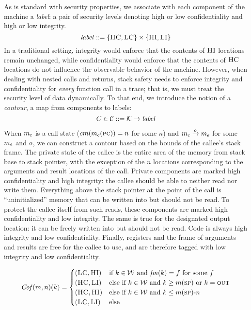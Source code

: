 \documentclass[acmsmall,review,anonymous]{acmart}\settopmatter{printfolios=true,printccs=false,printacmref=false}
\begin{document}
{As is standard with security properties, we associate with each
component of the machine a {\em label}: a pair of security levels
denoting high or low confidentiality and high or low integrity.
%
\[\mathit{label} ::= \{\textsc{HC},\textsc{LC}\} \times \{\textsc{HI},\textsc{LI}\}\]
%
In a traditional setting, integrity would enforce that the contents of
$\textsc{HI}$ locations remain unchanged, while confidentiality would
enforce that the contents of $\textsc{HC}$ locations do not influence the
observable behavior of the machine. However, when dealing with nested
calls and returns, stack safety needs to enforce integrity and
confidentiality for {\em every} function call in a trace; that is, we
must treat the security level of data dynamically.
%
To that end, we introduce the notion of a {\em contour}, a map from
components to labels:
%
\[C \in {\mathcal C} ::= {\mathcal K} \rightarrow \mathit{label}\]

When \(m_c\) is a call state (\(cm(m_c(\textsc{pc})) = n\) for some $n$) and
\(m_c \xrightarrow{o} m_e\) for some
$m_e$ and $o$, we can construct a contour based on the bounds of the
callee's stack frame.
%
The private state of the callee is the entire area of the memory from
stack base to stack pointer, with the exception of the $n$ locations
corresponding to the arguments and result locations of the
call. Private components are marked high confidentiality and high
integrity: the callee should be able to neither read nor write them.
%
Everything above the stack pointer at the point of the call is
``uninitialized'' memory that can be written into but should not be
read. To protect the callee itself from such reads, these components
are marked high confidentiality and low integrity.
%
The same is true for the designated output location: it can be
freely written into but should not be read.
%
Code is always high integrity and low confidentiality.
%
Finally, registers and the frame of arguments and results are free
for the callee to use, and are therefore tagged with low integrity and
low confidentiality.

 \[\mathit{Cof}(m,n)(k) =
  \begin{cases}
    (\textsc{LC},\textsc{HI}) & \text{if } k \in {\mathcal W}
                         \text{ and } \mathit{fm}(k) = f \text{ for some }f\\
    (\textsc{HC},\textsc{LI}) & \text{else if } k \in {\mathcal W}
                          \text{ and } k \geq m(\textsc{sp})
                          \text{ or } k = \textsc{out}\\
    (\textsc{HC},\textsc{HI}) & \text{else if } k \in {\mathcal W}
                          \text{ and } k \leq m(\textsc{sp}) \textrm{-}  n \\
    (\textsc{LC},\textsc{LI}) & \text{else} \\
  \end{cases}\]

}
\end{document}
